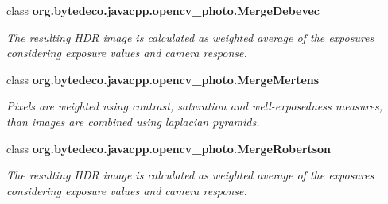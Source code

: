 \begin{DoxyCompactItemize}
class {\bfseries org.\+bytedeco.\+javacpp.\+opencv\+\_\+photo.\+Merge\+Debevec}
\begin{DoxyCompactList}\small\item\em The resulting H\+DR image is calculated as weighted average of the exposures considering exposure values and camera response. \end{DoxyCompactList}\item 
class {\bfseries org.\+bytedeco.\+javacpp.\+opencv\+\_\+photo.\+Merge\+Mertens}
\begin{DoxyCompactList}\small\item\em Pixels are weighted using contrast, saturation and well-\/exposedness measures, than images are combined using laplacian pyramids. \end{DoxyCompactList}\item 
class {\bfseries org.\+bytedeco.\+javacpp.\+opencv\+\_\+photo.\+Merge\+Robertson}
\begin{DoxyCompactList}\small\item\em The resulting H\+DR image is calculated as weighted average of the exposures considering exposure values and camera response. \end{DoxyCompactList}\end{DoxyCompactItemize}
